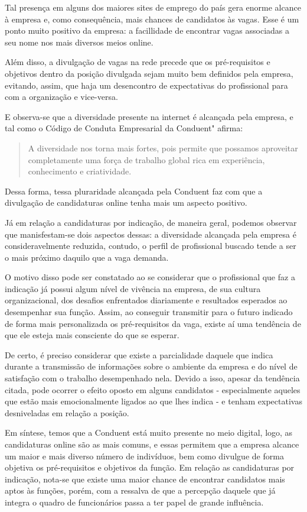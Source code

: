 \documentclass[12pt]{article}
\begin{document}
Tal presença em alguns dos maiores sites de emprego do país gera enorme alcance à empresa e, como consequência, mais chances de candidatos às vagas. Esse é um ponto muito positivo da empresa: a facillidade de encontrar vagas associadas a seu nome nos mais diversos meios online.

Além disso, a divulgação de vagas na rede precede que os pré-requisitos e objetivos dentro da posição divulgada sejam muito bem definidos pela empresa, evitando, assim, que haja um desencontro de expectativas do profissional para com a organização e vice-versa. 

E observa-se que a diversidade  presente na internet é alcançada pela empresa, e tal como o Código de Conduta Empresarial da Conduent" afirma: 

\begin{quote}
A diversidade nos torna mais fortes, pois permite que possamos aproveitar completamente uma força de trabalho global rica em experiência, conhecimento e criatividade.
\end{quote}


Dessa forma, tessa pluraridade alcançada pela Conduent faz com que a divulgação de candidaturas online tenha mais um aspecto positivo. 

Já em relação a candidaturas por indicação, de maneira geral, podemos observar que manisfestam-se dois aspectos dessas: a diversidade alcançada pela empresa é consideravelmente reduzida, contudo, o perfil de profissional buscado tende a ser o mais próximo daquilo que a vaga demanda. 

O motivo disso pode ser constatado ao se considerar que o profissional que faz a indicação já possui algum nível de vivência na empresa, de sua cultura organizacional, dos desafios enfrentados diariamente e resultados esperados ao desempenhar sua função. Assim, ao conseguir transmitir para o futuro indicado de forma mais personalizada os pré-requisitos da vaga, existe aí uma tendência de que ele esteja mais consciente do que se esperar.  

De certo, é preciso considerar que existe a parcialidade daquele que indica durante a transmissão de informações sobre o ambiente da empresa e do nível de satisfação com o trabalho desempenhado nela. Devido a isso, apesar da tendência citada, pode ocorrer o efeito oposto em alguns candidatos - especialmente aqueles que estão mais emocionalmente ligados ao que lhes indica - e tenham expectativas desniveladas em relação a posição.

Em síntese, temos que a Conduent está muito presente no meio digital, logo, as candidaturas online são as mais comuns, e essas permitem que a empresa alcance um maior e mais diverso número de indivíduos, bem como divulgue de forma objetiva os pré-requisitos e objetivos da função. Em relação as candidaturas por indicação, nota-se que existe uma maior chance de encontrar candidatos mais aptos às funções, porém, com a ressalva de que a percepção daquele que já integra o quadro de funcionários passa a ter papel de grande influência.  
 
\end{document}
